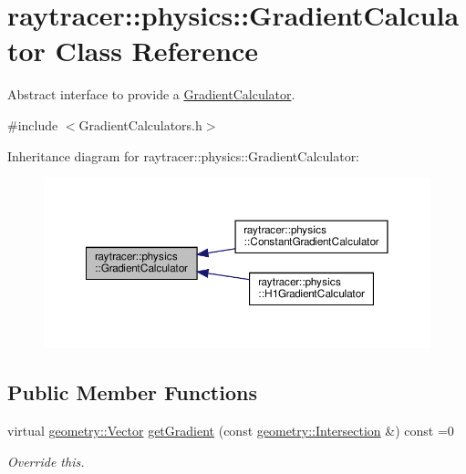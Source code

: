 \hypertarget{classraytracer_1_1physics_1_1GradientCalculator}{}\section{raytracer\+:\+:physics\+:\+:Gradient\+Calculator Class Reference}
\label{classraytracer_1_1physics_1_1GradientCalculator}


Abstract interface to provide a \hyperlink{classraytracer_1_1physics_1_1GradientCalculator}{Gradient\+Calculator}.  




{\ttfamily \#include $<$Gradient\+Calculators.\+h$>$}



Inheritance diagram for raytracer\+:\+:physics\+:\+:Gradient\+Calculator\+:\nopagebreak
\begin{figure}[H]
\begin{center}
\leavevmode
\includegraphics[width=350pt]{classraytracer_1_1physics_1_1GradientCalculator__inherit__graph}
\end{center}
\end{figure}
\subsection*{Public Member Functions}
\begin{DoxyCompactItemize}
\item 
virtual \hyperlink{classraytracer_1_1geometry_1_1Vector}{geometry\+::\+Vector} \hyperlink{classraytracer_1_1physics_1_1GradientCalculator_aeca43f861f5a5099a42bd8af1550f3dc}{get\+Gradient} (const \hyperlink{structraytracer_1_1geometry_1_1Intersection}{geometry\+::\+Intersection} \&) const =0
\begin{DoxyCompactList}\small\item\em Override this. \end{DoxyCompactList}\end{DoxyCompactItemize}


